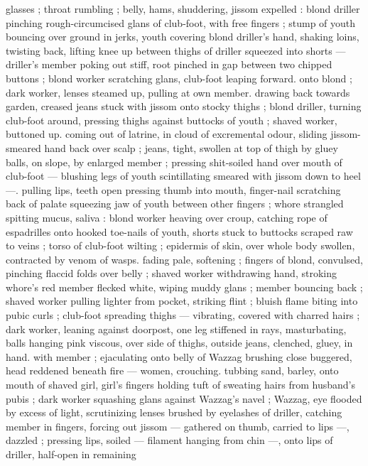 glasses ; throat rumbling ; belly, hams, shuddering, jissom expelled : 
blond driller pinching rough-circumcised glans of club-foot, with free 
fingers ; stump of youth bouncing over ground in jerks, youth 
covering blond driller's hand, shaking loins, twisting back, lifting 
knee up between thighs of driller squeezed into shorts --- driller's 
member poking out stiff, root pinched in gap between two chipped 
buttons ; blond worker scratching glans, club-foot leaping forward. 
onto blond ; dark worker, lenses steamed up, pulling at own member. 
drawing back towards garden, creased jeans stuck with jissom onto 
stocky thighs ; blond driller, turning club-foot around, pressing 
thighs against buttocks of youth ; shaved worker, buttoned up. 
coming out of latrine, in cloud of excremental odour, sliding jissom- 
smeared hand back over scalp ; jeans, tight, swollen at top of thigh 
by gluey balls, on slope, by enlarged member ; pressing shit-soiled 
hand over mouth of club-foot --- blushing legs of youth scintillating 
smeared with jissom down to heel ---. pulling lips, teeth open 
pressing thumb into mouth, finger-nail scratching back of palate 
squeezing jaw of youth between other fingers ; whore strangled 
spitting mucus, saliva : blond worker heaving over croup, catching 
rope of espadrilles onto hooked toe-nails of youth, shorts stuck to 
buttocks scraped raw to veins ; torso of club-foot wilting ; epidermis 
of skin, over whole body swollen, contracted by venom of wasps. 
fading pale, softening ; fingers of blond, convulsed, pinching flaccid 
folds over belly ; shaved worker withdrawing hand, stroking whore's 
red member flecked white, wiping muddy glans ; member bouncing 
back ; shaved worker pulling lighter from pocket, striking flint ; bluish 
flame biting into pubic curls ; club-foot spreading thighs --- 
vibrating, covered with charred hairs ; dark worker, leaning against 
doorpost, one leg stiffened in rays, masturbating, balls hanging pink 
viscous, over side of thighs, outside jeans, clenched, gluey, in hand. 
with member ; ejaculating onto belly of Wazzag brushing close 
buggered, head reddened beneath fire --- women, crouching. 
tubbing sand, barley, onto mouth of shaved girl, girl's fingers 
holding tuft of sweating hairs from husband's pubis ; dark worker 
squashing glans against Wazzag's navel ; Wazzag, eye flooded by 
excess of light, scrutinizing lenses brushed by eyelashes of driller, 
catching member in fingers, forcing out jissom --- gathered on 
thumb, carried to lips ---, dazzled ; pressing lips, soiled --- filament 
hanging from chin ---, onto lips of driller, half-open in remaining 
